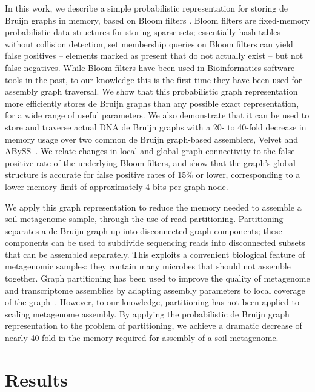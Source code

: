 \documentclass{pnastwo}
\begin{document}
\begin{article}
In this work, we describe a simple probabilistic representation for
storing de Bruijn graphs in memory, based on Bloom filters
\cite{bloom}.  Bloom filters are fixed-memory probabilistic data
structures for storing sparse sets; essentially hash tables without
collision detection, set membership queries on Bloom filters can yield
false positives -- elements marked as present that do not actually
exist -- but not false negatives. While Bloom filters have been used
in Bioinformatics software tools in the
past\cite{bloomref1,bloomref2,bloomref3,bloomref4}, to our knowledge
this is the first time they have been used for assembly graph
traversal. We show that this probabilistic graph representation more
efficiently stores de Bruijn graphs than any possible exact
representation, for a wide range of useful parameters.  We also
demonstrate that it can be used to store and traverse actual DNA de
Bruijn graphs with a 20- to 40-fold decrease in memory usage over two
common de Bruijn graph-based assemblers, Velvet and
ABySS~\cite{velvet,abyss}. We relate changes in local and global graph
connectivity to the false positive rate of the underlying Bloom
filters, and show that the graph's global structure is accurate for
false positive rates of 15\% or lower, corresponding to a lower memory
limit of approximately 4 bits per graph node.

We apply this graph representation to reduce the memory needed to
assemble a soil metagenome sample, through the use of read
partitioning.  Partitioning separates a de Bruijn graph up into
disconnected graph components; these components can be used to
subdivide sequencing reads into disconnected subsets that can be
assembled separately.  This exploits a convenient biological feature
of metagenomic samples: they contain many microbes that should not
assemble together.  Graph partitioning has been used to improve the
quality of metagenome and transcriptome assemblies by adapting
assembly parameters to local coverage of the
graph~\cite{metavelvet,pubmed21685107,trinity}.  However, to our
knowledge, partitioning has not been applied to scaling metagenome
assembly. By applying the probabilistic de Bruijn graph representation
to the problem of partitioning, we achieve a dramatic decrease of
nearly 40-fold in the memory required for assembly of a soil
metagenome.


\section{Results}


\end{article}
\end{document}
